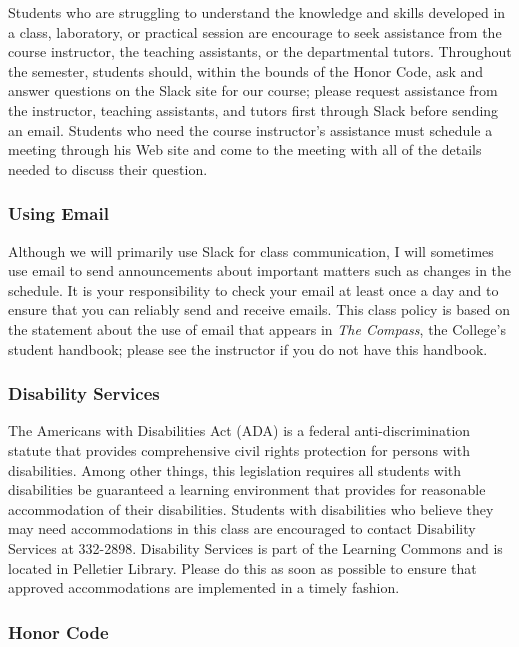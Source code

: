 Students who are struggling to understand the knowledge and skills developed in a class, laboratory, or practical
session are encourage to seek assistance from the course instructor, the teaching assistants, or the departmental
tutors. Throughout the semester, students should, within the bounds of the Honor Code, ask and answer questions on the
Slack site for our course; please request assistance from the instructor, teaching assistants, and tutors first through
Slack before sending an email. Students who need the course instructor's assistance must schedule a meeting through his
Web site and come to the meeting with all of the details needed to discuss their question.

\subsubsection*{Using Email}

Although we will primarily use Slack for class communication, I will sometimes use email to send announcements about
important matters such as changes in the schedule. It is your responsibility to check your email at least once a day and to
ensure that you can reliably send and receive emails. This class policy is based on the statement about the use of email that
appears in {\em The Compass}, the College's student handbook; please see the instructor if you do not have this
handbook.

\subsubsection*{Disability Services}

The Americans with Disabilities Act (ADA) is a federal anti-discrimination statute that provides comprehensive civil
rights protection for persons with disabilities.  Among other things, this legislation requires all students with
disabilities be guaranteed a learning environment that provides for reasonable accommodation of their disabilities.
Students with disabilities who believe they may need accommodations in this class are encouraged to contact Disability
Services at 332-2898.  Disability Services is part of the Learning Commons and is located in Pelletier Library.
Please do this as soon as possible to ensure that approved accommodations are implemented in a timely fashion.

\subsubsection*{Honor Code}

